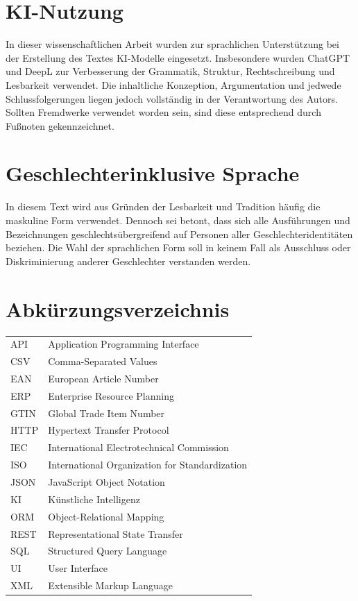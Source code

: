 \documentclass[12pt,a4paper]{article}
\begin{document}
\listoffigures
\section*{KI-Nutzung}

In dieser wissenschaftlichen Arbeit wurden zur sprachlichen Unterstützung bei der Erstellung des Textes KI-Modelle eingesetzt. Insbesondere wurden ChatGPT und DeepL zur Verbesserung der Grammatik, Struktur, Rechtschreibung und Lesbarkeit verwendet. Die inhaltliche Konzeption, Argumentation und jedwede Schlussfolgerungen liegen jedoch vollständig in der Verantwortung des Autors. Sollten Fremdwerke verwendet worden sein, sind diese entsprechend durch Fußnoten gekennzeichnet.

\section*{Geschlechterinklusive Sprache} 
In diesem Text wird aus Gründen der Lesbarkeit und Tradition häufig die maskuline Form verwendet. Dennoch sei betont, dass sich alle Ausführungen und Bezeichnungen geschlechtsübergreifend auf Personen aller Geschlechteridentitäten beziehen. Die Wahl der sprachlichen Form soll in keinem Fall als Ausschluss oder Diskriminierung anderer Geschlechter verstanden werden.
\newpage


\section*{Abkürzungsverzeichnis}

\begin{tabular}{@{}ll@{}}
API & Application Programming Interface \\
CSV & Comma-Separated Values \\
EAN & European Article Number \\
ERP & Enterprise Resource Planning \\
GTIN & Global Trade Item Number \\
HTTP & Hypertext Transfer Protocol \\
IEC & International Electrotechnical Commission \\
ISO & International Organization for Standardization \\
JSON & JavaScript Object Notation \\
KI & Künstliche Intelligenz \\
ORM & Object-Relational Mapping \\
REST & Representational State Transfer \\
SQL & Structured Query Language \\
UI & User Interface \\
XML & Extensible Markup Language \\

\end{tabular}
\end{document}
